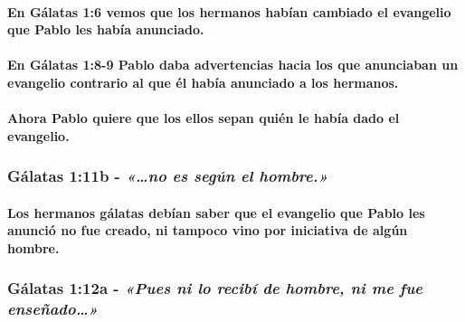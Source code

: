 \documentclass[11a pt,twoside]{article}
\newcommand{\scripture}[1]{%
  {\fontsize{12pt}{16pt}\selectfont\ScriptureFont\itshape #1}%
}
\def\textbf#1{#1}%
\let\oldsubsubsection\subsubsection
\renewcommand{\subsubsection}{\needspace{4\baselineskip}\oldsubsubsection}
\let\oldparagraph\paragraph
\renewcommand{\paragraph}{\needspace{3\baselineskip}\oldparagraph}
\begin{document}
\paragraph{En Gálatas 1:6 vemos que los hermanos habían cambiado el
evangelio que Pablo les había
anunciado.}\label{en-guxe1latas-16-vemos-que-los-hermanos-habuxedan-cambiado-el-evangelio-que-pablo-les-habuxeda-anunciado.}

\paragraph{En Gálatas 1:8-9 Pablo daba advertencias hacia los que
anunciaban un evangelio contrario al que él había anunciado a los
hermanos.}\label{en-guxe1latas-18-9-pablo-daba-advertencias-hacia-los-que-anunciaban-un-evangelio-contrario-al-que-uxe9l-habuxeda-anunciado-a-los-hermanos.}

\paragraph{\texorpdfstring{Ahora Pablo quiere que los ellos sepan
\textbf{quién} le había dado el
evangelio.}{Ahora Pablo quiere que los ellos sepan quién le había dado el evangelio.}}\label{ahora-pablo-quiere-que-los-ellos-sepan-quiuxe9n-le-habuxeda-dado-el-evangelio.}

\subsubsection{\texorpdfstring{Gálatas 1:11b -
\scripture{«…no es según el hombre.»}}{Gálatas 1:11b - }}\label{guxe1latas-111b---no-es-seguxfan-el-hombre.}

\paragraph{Los hermanos gálatas debían saber que el evangelio que Pablo
les anunció no fue creado, ni tampoco vino por iniciativa de algún
hombre.}\label{los-hermanos-guxe1latas-debuxedan-saber-que-el-evangelio-que-pablo-les-anunciuxf3-no-fue-creado-ni-tampoco-vino-por-iniciativa-de-alguxfan-hombre.}

\subsubsection{\texorpdfstring{Gálatas 1:12a -
\scripture{«Pues ni lo recibí de hombre, ni me fue enseñado…»}}{Gálatas 1:12a - }}\label{guxe1latas-112a---pues-ni-lo-recibuxed-de-hombre-ni-me-fue-enseuxf1ado}
\end{document}
